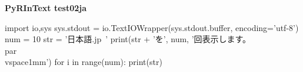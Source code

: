 \documentclass[pdflatex, jadriver=standard]{bxjsarticle}
\begin{document}
{\Large\bf PyRInText test02ja}\\

\begin{pycode}
import io,sys 
sys.stdout = io.TextIOWrapper(sys.stdout.buffer, encoding='utf-8')
num = 10
str = '日本語.jp~'
print(str + 'を', num, '回表示します。\\par \\vspace{1mm}')
for i in range(num):
	print(str)
\end{pycode}
\end{document}
